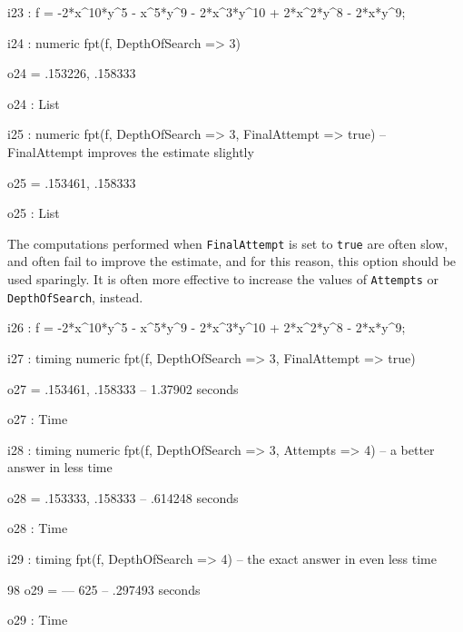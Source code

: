 \documentclass{amsart}
\begin{document}
\bigskip
{\small
{}
\begin{MyVerbatim}
i23 : f = -2*x^10*y^5 - x^5*y^9 - 2*x^3*y^10 + 2*x^2*y^8 - 2*x*y^9;

i24 : numeric fpt(f, DepthOfSearch => 3)

o24 = {.153226, .158333}

o24 : List

i25 : numeric fpt(f, DepthOfSearch => 3, FinalAttempt => true)
      -- FinalAttempt improves the estimate slightly

o25 = {.153461, .158333}

o25 : List
\end{MyVerbatim}
}
\bigskip


The computations performed when \texttt{FinalAttempt} is set to \texttt{true} are often slow, and often fail to improve the estimate, and for this reason, this option should be used sparingly. It is often more effective to increase the values of \texttt{Attempts} or \texttt{DepthOfSearch}, instead.

\bigskip
{\small
{}
\begin{MyVerbatim}
i26 : f = -2*x^10*y^5 - x^5*y^9 - 2*x^3*y^10 + 2*x^2*y^8 - 2*x*y^9;

i27 : timing numeric fpt(f, DepthOfSearch => 3, FinalAttempt => true)

o27 = {.153461, .158333}
      -- 1.37902 seconds

o27 : Time

i28 : timing numeric fpt(f, DepthOfSearch => 3, Attempts => 4) -- a better
      answer in less time

o28 = {.153333, .158333}
      -- .614248 seconds

o28 : Time

i29 : timing fpt(f, DepthOfSearch => 4) -- the exact answer in even less
      time

       98
o29 = ---
      625
      -- .297493 seconds

o29 : Time
\end{MyVerbatim}
}
\bigskip

\end{document}
